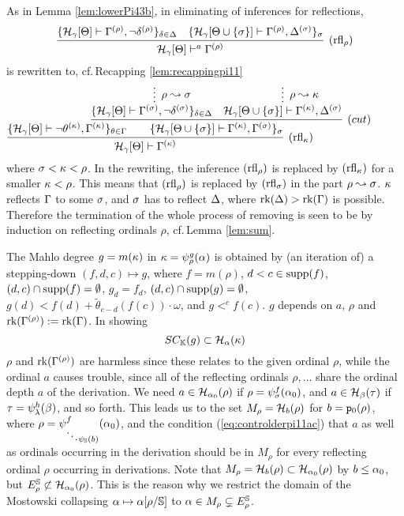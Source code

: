 \documentclass{article}
\newcommand{\mS}{\mathbb{S}}
\newcommand{\mK}{\mathbb{K}}
\begin{document}
As in
Lemma \ref{lem:lowerPi43b}, in eliminating of inferences for reflections,
{\small
\[
\infer[({\rm rfl}_{\rho})]{
\calh_{\gam}[\Tht]\vdash^{a}\Gam^{(\rho)}
}
{
\{
\mathcal{H}_{\gam}[\Tht]\vdash\Gamma^{(\rho)}, \lnot\del^{(\rho)}
\}_{\del\in\Del}
&
\{
\mathcal{H}_{\gam}[\Tht\cup \{\sig\}]\vdash\Gamma^{(\rho)}, 
\Del^{(\sig)}
\}_{\sig}
}
\]
}
 is rewritten to, cf.\,Recapping \ref{lem:recappingpi11}
{\small
\[
\hspace{-10mm}
\infer[({\rm rfl}_{\kap})]{\mathcal{H}_{\gam}[\Tht]\vdash\Gam^{(\kap)}}
{
\{\mathcal{H}_{\gam}[\Tht]\vdash\lnot\tht^{(\kap)},\Gam^{(\kap)}\}_{\tht\in\Gam}
&
\hspace{-15mm}
\infer[(cut)]{
\{\mathcal{H}_{\gam}[\Tht\cup \{\sig\}]\vdash
\Gamma^{(\kap)},\Gam^{(\sig)}\}_{\sig}
}
 {
 \{
 \infer*[\rho\leadsto\sig]{\mathcal{H}_{\gam}[\Tht]\vdash\Gamma^{(\sig)}, \lnot \del^{(\sig)}
 \}_{\del\in\Del}}{}
 &
 \infer*[\rho\leadsto\kap]{\mathcal{H}_{\gam}[\Tht\cup \{\sig\}]\vdash\Gamma^{(\kap)}, 
\Del^{(\sig)}}{}
 }
}
\]
}
where $\sigma<\kappa<\rho$.
In the rewriting, the inference $({\rm rfl}_{\rho})$ is replaced by $({\rm rfl}_{\kappa})$
for a smaller $\kappa<\rho$.
This means that $({\rm rfl}_{\rho})$ is replaced by $({\rm rfl}_{\sigma})$ in the part $\rho\leadsto\sigma$.
$\kappa$ reflects $\Gamma$ to some $\sigma$, and
$\sigma$ has to reflect $\Delta$, where $\mbox{{\rm rk}}(\Delta)>\mbox{{\rm rk}}(\Gamma)$ is possible.
Therefore the termination of the whole process of removing is seen to be by induction on 
reflecting ordinals $\rho$, cf.\,Lemma \ref{lem:sum}.

The Mahlo degree $g=m(\kappa)$ in $\kappa=\psi_{\rho}^{g}(\alpha)$
 is obtained by (an iteration of) a stepping-down
$(f,d,c)\mapsto g$, where $f=m(\rho)$, $d<c\in {\rm supp}(f)$,
$(d,c)\cap {\rm supp}(f)=\emptyset$,
$g_{d}=f_{d}$, $(d,c)\cap {\rm supp}(g)=\emptyset$,
$g(d)<f(d)+\tilde{\theta}_{c-d}(f(c))\cdot\omega$, 
and $g<^{c}f(c)$.
$g$ depends on $a$, $\rho$ and $\mbox{{\rm rk}}(\Gamma^{(\rho)}):=\mbox{{\rm rk}}(\Gamma)$.
In showing 
\[
SC_{\mK}(g)\subset\calh_{\alp}(\kap)
\]
$\rho$ and $\mbox{{\rm rk}}(\Gamma^{(\rho)})$ are harmless since these relates to the given ordinal $\rho$,
while the ordinal $a$ causes trouble, since all of the reflecting ordinals $\rho,\ldots$ share
the ordinal depth $a$ of the derivation.
We need $a\in{\cal H}_{\alpha_{0}}(\rho)$ if $\rho=\psi_{\sigma}^{f}(\alpha_{0})$, and
$a\in{\cal H}_{\beta}(\tau)$ if $\tau=\psi_{\lambda}^{h}(\beta)$, and so forth.
This leads us to the set $M_{\rho}={\cal H}_{b}(\rho)$ for $b={\tt p}_{0}(\rho)$,
where $\displaystyle{\rho=\psi^{f}_{\ddots \psi_{\mS}(b)}(\alp_{0})}$,
and the condition (\ref{eq:controlderpi11ac}) that $a$ as well as ordinals occurring in the derivation
should be in $M_{\rho}$ for every reflecting ordinal $\rho$ occurring in derivations.
Note that $M_{\rho}={\cal H}_{b}(\rho)\subset{\cal H}_{\alpha_{0}}(\rho)$ by $b\leq\alpha_{0}$, but
$E^{\mS}_{\rho}\not\subset\calh_{\alp_{0}}(\rho)$.
This is the reason why we restrict the domain of the Mostowski collapsing $\alp\mapsto \alp[\rho/\mS]$
to $\alp\in M_{\rho}\subsetneq E^{\mS}_{\rho}$.
\end{document}
